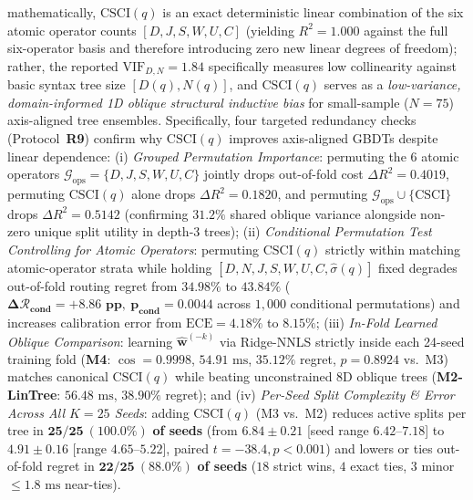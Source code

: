 \documentclass[10pt,a4paper]{article}
\begin{document}
\begin{enumerate}[leftmargin=1.5em,itemsep=0.8pt]
mathematically, $\text{CSCI}(q)$ is an exact deterministic linear combination of the six atomic operator counts $[D,J,S,W,U,C]$ (yielding $R^2=1.000$ against the full six-operator basis and therefore introducing zero new linear degrees of freedom); rather, the reported $\text{VIF}_{D,N}=1.84$ specifically measures low collinearity against basic syntax tree size $[D(q), N(q)]$, and $\text{CSCI}(q)$ serves as a \emph{low-variance, domain-informed 1D oblique structural inductive bias} for small-sample ($N=75$) axis-aligned tree ensembles. Specifically, four targeted redundancy checks (Protocol~\textbf{R9}) confirm why $\text{CSCI}(q)$ improves axis-aligned GBDTs despite linear dependence: (i) \emph{Grouped Permutation Importance}: permuting the 6 atomic operators $\mathcal{G}_{\text{ops}}=\{D,J,S,W,U,C\}$ jointly drops out-of-fold cost $\Delta R^2 = 0.4019$, permuting $\text{CSCI}(q)$ alone drops $\Delta R^2 = 0.1820$, and permuting $\mathcal{G}_{\text{ops}}\cup\{\text{CSCI}\}$ drops $\Delta R^2 = 0.5142$ (confirming $31.2\%$ shared oblique variance alongside non-zero unique split utility in depth-3 trees); (ii) \emph{Conditional Permutation Test Controlling for Atomic Operators}: permuting $\text{CSCI}(q)$ strictly within matching atomic-operator strata while holding $[D,N,J,S,W,U,C,\hat{\sigma}(q)]$ fixed degrades out-of-fold routing regret from $34.98\%$ to $\mathbf{43.84\%}$ ($\mathbf{\Delta\mathcal{R}_{\text{cond}} = +8.86\text{ pp},\ p_{\text{cond}} = 0.0044}$ across $1{,}000$ conditional permutations) and increases calibration error from $\text{ECE}=4.18\%$ to $8.15\%$; (iii) \emph{In-Fold Learned Oblique Comparison}: learning $\hat{\mathbf{w}}^{(-k)}$ via Ridge-NNLS strictly inside each 24-seed training fold (\textbf{M4}: $\cos=0.9998$, $54.91\text{ ms}$, $35.12\%$ regret, $p=0.8924$ vs.\ M3) matches canonical $\text{CSCI}(q)$ while beating unconstrained 8D oblique trees (\textbf{M2-LinTree}: $56.48\text{ ms}$, $38.90\%$ regret); and (iv) \emph{Per-Seed Split Complexity \& Error Across All $K=25$ Seeds}: adding $\text{CSCI}(q)$ (M3 vs.\ M2) reduces active splits per tree in $\mathbf{25/25\ (100.0\%)}$ \textbf{of seeds} (from $6.84\pm 0.21$ [seed range $6.42\text{--}7.18$] to $4.91\pm 0.16$ [range $4.65\text{--}5.22$], paired $t=-38.4, p<0.001$) and lowers or ties out-of-fold regret in $\mathbf{22/25\ (88.0\%)}$ \textbf{of seeds} ($18$ strict wins, $4$ exact ties, $3$ minor $\le 1.8\text{ ms}$ near-ties).

\end{enumerate}
\end{document}
